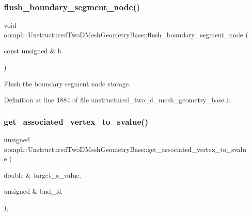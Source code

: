 \subsubsection{\texorpdfstring{flush\+\_\+boundary\+\_\+segment\+\_\+node()}{flush\_boundary\_segment\_node()}}
{\footnotesize\ttfamily void oomph\+::\+Unstructured\+Two\+D\+Mesh\+Geometry\+Base\+::flush\+\_\+boundary\+\_\+segment\+\_\+node (\begin{DoxyParamCaption}\item[{const unsigned \&}]{b }\end{DoxyParamCaption})\hspace{0.3cm}{\ttfamily [inline]}}



Flush the boundary segment node storage. 



Definition at line 1884 of file unstructured\+\_\+two\+\_\+d\+\_\+mesh\+\_\+geometry\+\_\+base.\+h.

\mbox{\label{classoomph_1_1UnstructuredTwoDMeshGeometryBase_a8f1cbe4c85634fc1bc7141ad3d2e973f}} 
\subsubsection{\texorpdfstring{get\+\_\+associated\+\_\+vertex\+\_\+to\+\_\+svalue()}{get\_associated\_vertex\_to\_svalue()}\hspace{0.1cm}{\footnotesize\ttfamily [1/2]}}
{\footnotesize\ttfamily unsigned oomph\+::\+Unstructured\+Two\+D\+Mesh\+Geometry\+Base\+::get\+\_\+associated\+\_\+vertex\+\_\+to\+\_\+svalue (\begin{DoxyParamCaption}\item[{double \&}]{target\+\_\+s\+\_\+value,  }\item[{unsigned \&}]{bnd\+\_\+id }\end{DoxyParamCaption})\hspace{0.3cm}{\ttfamily [inline]}, {\ttfamily [private]}}



